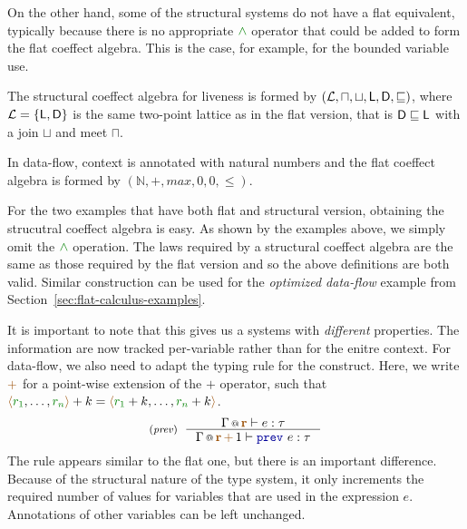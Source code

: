 On the other hand, some of the structural systems do not have a flat equivalent, typically 
because there is no appropriate $\czip$ operator that could be added to form the flat coeffect
algebra. This is the case, for example, for the bounded variable use.

\begin{example}
The structural coeffect algebra for liveness is formed by
$(\mathcal{L}, \sqcap, \sqcup, \textnormal{\sffamily L}, \textnormal{\sffamily D}, \sqsubseteq)$, where $\mathcal{L}=\{ \ident{L}, \ident{D} \}$ is 
the same two-point lattice as in the flat version, that is $\textnormal{\sffamily D} \sqsubseteq \textnormal{\sffamily L}$
with a join $\sqcup$ and meet $\sqcap$. 
\end{example}

\begin{example}
In data-flow, context is annotated with natural numbers and the flat coeffect algebra is formed 
by $(\mathbb{N}, +, \mathit{max}, 0, 0, \leq)$.
\end{example}

\noindent
For the two examples that have both flat and structural version, obtaining the strucutral coeffect
algebra is easy. As shown by the examples above, we simply omit the $\czip$ operation. The laws
required by a structural coeffect algebra are the same as those required by the flat version
and so the above definitions are both valid. Similar construction can be used for the
\emph{optimized data-flow} example from Section~\ref{sec:flat-calculus-examples}.

It is important to note that this gives us a systems with \emph{different} properties. The 
information are now tracked per-variable rather than for the enitre context. For data-flow,
we also need to adapt the typing rule for the  construct. Here, we write $\aclrd{+}$ 
for a point-wise extension of the $+$ operator, such that
$\alift{\cclrd{r_1}, \ldots, \cclrd{r_n}} + k = \alift{\cclrd{r_1} + k, \ldots, \cclrd{r_n} + k}$.
%
\begin{equation*}
\tyrule{prev}
  { \coctx{\Gamma}{\aclrd{\textbf{r}}} \vdash e : \tau }
  { \coctx{\Gamma}{\aclrd{\textbf{r}} \,\aclrd{+}\, 1} \vdash \kvd{prev}~e : \tau }
\end{equation*}
%
The rule appears similar to the flat one, but there is an important difference. Because of the
structural nature of the type system, it only increments the required number of values for 
variables that are used in the expression $e$. Annotations of other variables can be left 
unchanged. 

